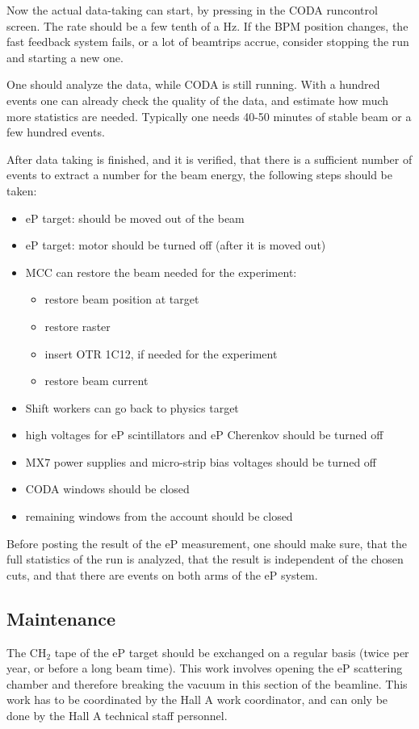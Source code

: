 {Now the actual data-taking can start, by pressing 
in the CODA runcontrol screen. The rate should be a few 
tenth of a Hz. If the BPM position changes, the fast feedback system fails, or a 
lot of beamtrips accrue, consider stopping the run and starting a new 
one.

One should analyze the data, while CODA is still running. 
With a hundred events one can already check the quality of the 
data, and estimate how much more statistics are needed.
Typically one needs 40-50 minutes of stable beam or a few 
hundred events.

After data taking is finished, and it is verified, that there
is a sufficient number of events to extract a number for the beam energy, 
the following steps should be taken:
\begin{itemize}
\item eP target: should be moved out of the beam
\item eP target: motor should be turned off (after it is moved out)
\item MCC can restore the beam needed for the experiment: 
\begin{itemize}
\item restore beam position at target
\item restore raster
\item insert OTR 1C12, if needed for the experiment
\item restore beam current
\end{itemize}
\item Shift workers can go back to physics target
\item high voltages for eP scintillators and eP Cherenkov should be turned off
\item MX7 power supplies and micro-strip bias voltages should be turned off
\item CODA windows should be closed
\item remaining windows from the  account should be closed
\end{itemize}
Before posting the result of the eP measurement, one should make sure,
that the full statistics of the run is analyzed, that the result is 
independent of the chosen cuts, and that there are events on both 
arms of the eP system.

\subsection{Maintenance}
\label{sec:ep_maintenance}

The CH$_2$ tape of the eP target 
should be exchanged on a regular basis (twice per year, or 
before a long beam time). This work involves opening the 
eP scattering chamber and therefore breaking the vacuum in
this section of the beamline. This work has to be coordinated
by the Hall A work coordinator, and can only be done by the 
Hall A technical staff personnel. 
}

